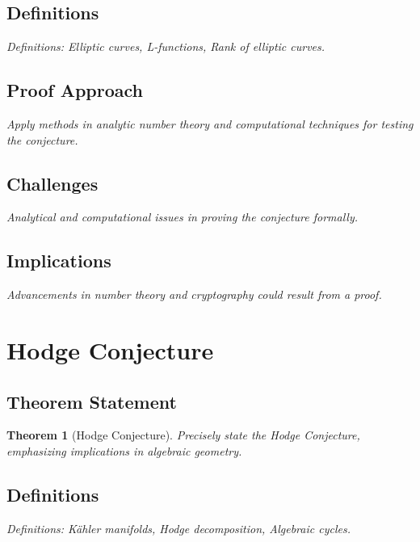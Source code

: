 \documentclass[12pt, a4paper]{article}
\newtheorem{theorem}{Theorem}[section]
\begin{document}
\subsection{Definitions}
\textit{Definitions: Elliptic curves, L-functions, Rank of elliptic curves.}

\subsection{Proof Approach}
\textit{Apply methods in analytic number theory and computational techniques for testing the conjecture.}

\subsection{Challenges}
\textit{Analytical and computational issues in proving the conjecture formally.}

\subsection{Implications}
\textit{Advancements in number theory and cryptography could result from a proof.}


\section{Hodge Conjecture}
\subsection{Theorem Statement}
\begin{theorem}[Hodge Conjecture]
\label{thm:hodge}
\textit{Precisely state the Hodge Conjecture, emphasizing implications in algebraic geometry.}
\end{theorem}

\subsection{Definitions}
\textit{Definitions: Kähler manifolds, Hodge decomposition, Algebraic cycles.}
\end{document}

